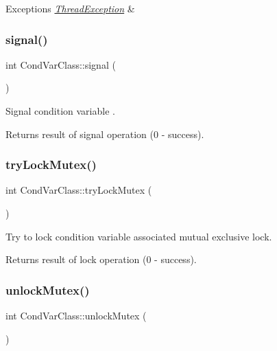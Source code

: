 \begin{DoxyExceptions}{Exceptions}
{\em \hyperlink{classThreadException}{Thread\+Exception}} & \\
\hline
\end{DoxyExceptions}
\mbox{\label{classCondVarClass_ab17290f0dcf8c4c9dd31ef2739a073ba}} 
\subsubsection{\texorpdfstring{signal()}{signal()}}
{\footnotesize\ttfamily int Cond\+Var\+Class\+::signal (\begin{DoxyParamCaption}{ }\end{DoxyParamCaption})\hspace{0.3cm}{\ttfamily [inline]}}

Signal condition variable . \begin{DoxyReturn}{Returns}
result of signal operation (0 -\/ success). 
\end{DoxyReturn}
\mbox{\label{classCondVarClass_adf84284d765eab42cee949e94c945678}} 
\subsubsection{\texorpdfstring{try\+Lock\+Mutex()}{tryLockMutex()}}
{\footnotesize\ttfamily int Cond\+Var\+Class\+::try\+Lock\+Mutex (\begin{DoxyParamCaption}{ }\end{DoxyParamCaption})\hspace{0.3cm}{\ttfamily [inline]}}

Try to lock condition variable associated mutual exclusive lock. \begin{DoxyReturn}{Returns}
result of lock operation (0 -\/ success). 
\end{DoxyReturn}
\mbox{\label{classCondVarClass_a10ccd0a73746e5c4bf66157468ae8bf5}} 
\subsubsection{\texorpdfstring{unlock\+Mutex()}{unlockMutex()}}
{\footnotesize\ttfamily int Cond\+Var\+Class\+::unlock\+Mutex (\begin{DoxyParamCaption}{ }\end{DoxyParamCaption})\hspace{0.3cm}{\ttfamily [inline]}}

